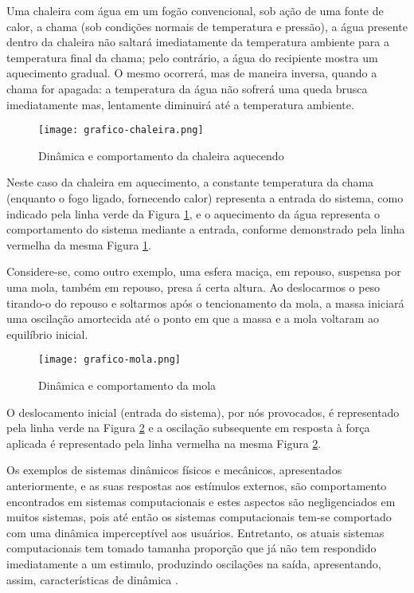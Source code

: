 \begin{description}
	\item Uma chaleira com água em um fogão convencional, sob ação de uma fonte de calor, a chama (sob condições normais de temperatura e pressão), a água presente dentro da chaleira não saltará imediatamente da temperatura ambiente para a temperatura final da chama; pelo contrário, a água do recipiente mostra um aquecimento gradual. O mesmo ocorrerá, mas de maneira inversa, quando a chama for apagada: a temperatura da água não sofrerá uma queda brusca imediatamente mas, lentamente diminuirá até a temperatura ambiente.
	
	\begin{figure}[htb]
		\centering
		\texttt{[image: grafico-chaleira.png]}
		\caption{Dinâmica e comportamento da chaleira aquecendo}
		\label{fig:chaleira}
	\end{figure}
	
	Neste caso da chaleira em aquecimento, a constante temperatura da chama (enquanto o fogo ligado, fornecendo calor) representa a entrada do sistema, como indicado pela linha verde da Figura \ref{fig:chaleira}, e o aquecimento da água representa o comportamento do sistema mediante a entrada, conforme demonstrado pela linha vermelha da mesma Figura \ref{fig:chaleira}. 
	
	\item Considere-se, como outro exemplo, uma esfera maciça, em repouso, suspensa por uma mola, também em repouso, presa á certa altura. Ao deslocarmos o peso tirando-o do repouso e soltarmos após o tencionamento da mola, a massa iniciará uma oscilação amortecida até o ponto em que a massa e a mola voltaram ao equilíbrio inicial.	
	
	\begin{figure}[!htb]
		\centering
		\texttt{[image: grafico-mola.png]}
		\caption{Dinâmica e comportamento da mola}
		\label{fig:mola}		
	\end{figure}
	
	O deslocamento inicial (entrada do sistema), por nós provocados, é representado pela linha verde na Figura \ref{fig:mola} e a oscilação subsequente em resposta à força aplicada é representado pela linha vermelha na mesma Figura \ref{fig:mola}.
\end{description}

Os exemplos de sistemas dinâmicos físicos e mecânicos, apresentados anteriormente, e as suas respostas aos estímulos externos, são comportamento encontrados em sistemas computacionais e estes aspectos são negligenciados em muitos sistemas, pois até então os sistemas computacionais tem-se comportado com uma dinâmica imperceptível aos usuários. Entretanto, os atuais sistemas computacionais tem tomado tamanha proporção que já não tem respondido imediatamente a um estimulo, produzindo oscilações na saída, apresentando, assim, características de dinâmica \cite{Janert2013}.


